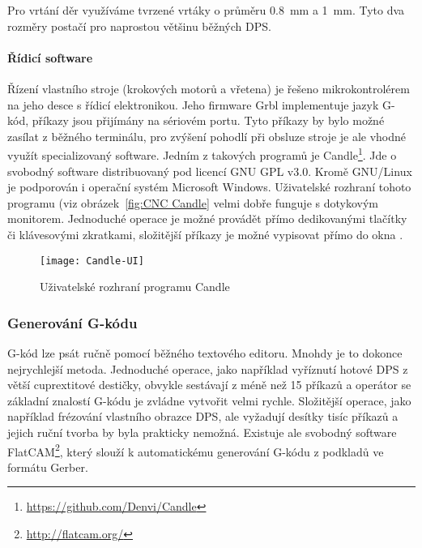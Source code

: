 Pro vrtání děr využíváme tvrzené vrtáky o průměru \SI{0,8}{\milli\meter}
a \SI{1}{\milli\meter}. Tyto dva rozměry postačí pro naprostou většinu běžných
DPS.


\paragraph{Řídicí software}
Řízení vlastního stroje (krokových motorů a vřetena) je řešeno mikrokontrolérem
na jeho desce s řídicí elektronikou. Jeho firmware Grbl implementuje jazyk
G-kód, příkazy jsou přijímány na sériovém portu. Tyto příkazy by bylo možné
zasílat z běžného terminálu, pro zvýšení pohodlí při obsluze stroje je ale
vhodné využít specializovaný software. Jedním z takových programů je
Candle\footnote{\url{https://github.com/Denvi/Candle}}. Jde o svobodný software
distribuovaný pod licencí GNU GPL v3.0. Kromě GNU/Linux je podporován
i operační systém Microsoft Windows. Uživatelské rozhraní tohoto programu (viz
obrázek~\vref{fig:CNC Candle} velmi dobře funguje s dotykovým monitorem.
Jednoduché operace je možné provádět přímo dedikovanými tlačítky či klávesovými
zkratkami, složitější příkazy je možné vypisovat přímo do okna .


\begin{figure}[htbp]
    \centering
    \texttt{[image: Candle-UI]}
    \caption{Uživatelské rozhraní programu Candle}
    \label{fig:CNC Candle}
\end{figure}


\subsubsection{Generování G-kódu}
G-kód lze psát ručně pomocí běžného textového editoru. Mnohdy je to dokonce
nejrychlejší metoda. Jednoduché operace, jako například vyříznutí hotové DPS
z větší cuprextitové destičky, obvykle sestávají z méně než 15 příkazů
a operátor se základní znalostí G-kódu je zvládne vytvořit velmi rychle.
Složitější operace, jako například frézování vlastního obrazce DPS, ale
vyžadují desítky tisíc příkazů a jejich ruční tvorba by byla prakticky nemožná.
Existuje ale svobodný software FlatCAM\footnote{\url{http://flatcam.org/}},
který slouží k automatickému generování G-kódu z podkladů ve formátu Gerber.
